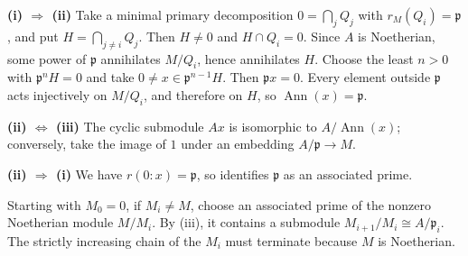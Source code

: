 \textbf{(i) $\Rightarrow$ (ii)} Take a minimal primary decomposition $0=\bigcap_jQ_j$ with $r_M(Q_i)=\mathfrak{p}$, and put $H=\bigcap_{j\ne i}Q_j$. Then $H\ne0$ and $H\cap Q_i=0$. Since $A$ is Noetherian, some power of $\mathfrak{p}$ annihilates $M/Q_i$, hence annihilates $H$. Choose the least $n>0$ with $\mathfrak{p}^nH=0$ and take $0\ne x\in\mathfrak{p}^{n-1}H$. Then $\mathfrak{p}x=0$. Every element outside $\mathfrak{p}$ acts injectively on $M/Q_i$, and therefore on $H$, so $\operatorname{Ann}(x)=\mathfrak{p}$.

\textbf{(ii) $\Leftrightarrow$ (iii)} The cyclic submodule $Ax$ is isomorphic to $A/\operatorname{Ann}(x)$; conversely, take the image of $1$ under an embedding $A/\mathfrak{p}\to M$.

\textbf{(ii) $\Rightarrow$ (i)} We have $r(0:x)=\mathfrak{p}$, so  identifies $\mathfrak{p}$ as an associated prime.

Starting with $M_0=0$, if $M_i\ne M$, choose an associated prime of the nonzero Noetherian module $M/M_i$. By (iii), it contains a submodule $M_{i+1}/M_i\cong A/\mathfrak{p}_i$. The strictly increasing chain of the $M_i$ must terminate because $M$ is Noetherian.
